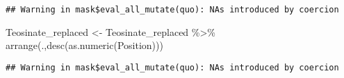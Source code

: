 \documentclass[
]{article}
\newenvironment{Shaded}{\begin{snugshade}}{\end{snugshade}}
\newcommand{\CommentTok}[1]{\textcolor[rgb]{0.56,0.35,0.01}{\textit{#1}}}
\newcommand{\FunctionTok}[1]{\textcolor[rgb]{0.00,0.00,0.00}{#1}}
\newcommand{\NormalTok}[1]{#1}
\newcommand{\OtherTok}[1]{\textcolor[rgb]{0.56,0.35,0.01}{#1}}
\newcommand{\SpecialCharTok}[1]{\textcolor[rgb]{0.00,0.00,0.00}{#1}}
\begin{document}
\begin{verbatim}
## Warning in mask$eval_all_mutate(quo): NAs introduced by coercion
\end{verbatim}

\begin{Shaded}
\begin{Highlighting}[]
\NormalTok{Teosinate\_replaced }\OtherTok{\textless{}{-}}\NormalTok{ Teosinate\_replaced }\SpecialCharTok{\%\textgreater{}\%} \FunctionTok{arrange}\NormalTok{(.,}\FunctionTok{desc}\NormalTok{(}\FunctionTok{as.numeric}\NormalTok{(Position)))}
\end{Highlighting}
\end{Shaded}

\begin{verbatim}
## Warning in mask$eval_all_mutate(quo): NAs introduced by coercion
\end{verbatim}

\begin{Shaded}
\end{Shaded}
\end{document}
